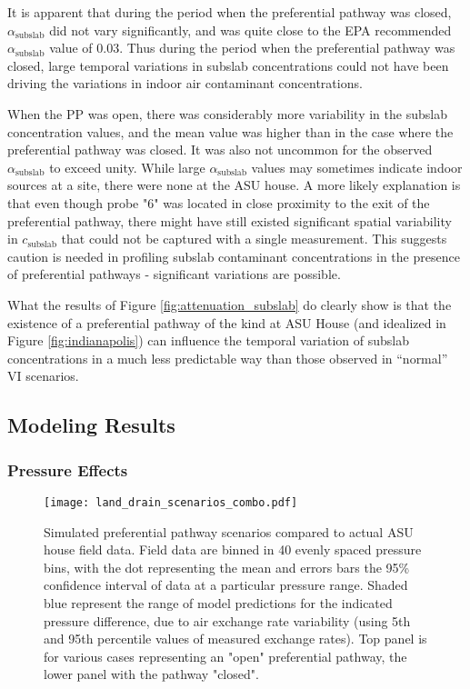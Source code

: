 \documentclass[journal=esthag,manuscript=article]{achemso}
\begin{document}
It is apparent that during the period when the preferential pathway was closed, $\alpha_\mathrm{subslab}$ did not vary significantly, and was quite close to the EPA recommended $\alpha_\mathrm{subslab}$ value of 0.03\cite{u.s._environmental_protection_agency_oswer_2015}.
Thus during the period when the preferential pathway was closed, large temporal variations in subslab concentrations could not have been driving the variations in indoor air contaminant concentrations.\par

When the PP was open, there was considerably more variability in the subslab concentration values, and the mean value was higher than in the case where the preferential pathway was closed.
It was also not uncommon for the observed $\alpha_\mathrm{subslab}$ to exceed unity.
While large $\alpha_\mathrm{subslab}$ values may sometimes indicate indoor sources at a site, there were none at the ASU house.
A more likely explanation is that even though probe "6" was located in close proximity to the exit of the preferential pathway, there might have still existed significant spatial variability in $c_\mathrm{subslab}$ that could not be captured with a single measurement.
This suggests caution is needed in profiling subslab contaminant concentrations in the presence of preferential pathways - significant variations are possible.\par

What the results of Figure \ref{fig:attenuation_subslab} do clearly show is that the existence of a preferential pathway of the kind at ASU House (and idealized in Figure \ref{fig:indianapolis}) can influence the temporal variation of subslab concentrations in a much less predictable way than those observed in “normal” VI scenarios.\par

\subsection{Modeling Results}

\subsubsection{Pressure Effects}

\begin{figure}[htb!]
 \centering
 \caption{Simulated preferential pathway scenarios compared to actual ASU house field data. Field data are binned in 40 evenly spaced pressure bins, with the dot representing the mean and errors bars the 95\% confidence interval of data at a particular pressure range. Shaded blue represent the range of model predictions for the indicated pressure difference, due to air exchange rate variability (using 5th and 95th percentile values of measured exchange rates). Top panel is for various cases representing an "open" preferential pathway, the lower panel with the pathway "closed". }\label{fig:land_drain_scenarios}
 \texttt{[image: land\_drain\_scenarios\_combo.pdf]}
\end{figure}
\end{document}
